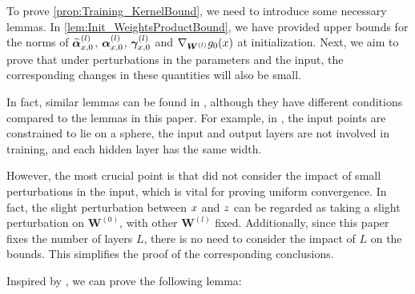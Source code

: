 To prove \cref{prop:Training_KernelBound}, we need to introduce some necessary lemmas.
In \cref{lem:Init_WeightsProductBound}, we have provided upper bounds for the norms of ${\widetilde{\bm{\alpha}}_{x,0}^{(l)}}$, ${{\bm{\alpha}}_{x,0}^{(l)}}$, $\bm{\gamma}^{(l)}_{x,0}$ and $\nabla_{\bm{W}^{(l)}} g_0(x)$ at initialization.
Next, we aim to prove that under perturbations in the parameters and the input, the corresponding changes in these quantities will also be small.

In fact, similar lemmas can be found in \citet{allen-zhu2019_ConvergenceTheory}, although they have different conditions compared to the lemmas in this paper.
For example, in \citet{allen-zhu2019_ConvergenceTheory}, the input points are constrained to lie on a sphere, the input and output layers are not involved in training, and each hidden layer has the same width.

However, the most crucial point is that \citet{allen-zhu2019_ConvergenceTheory} did not consider the impact of small perturbations in the input, which is vital for proving uniform convergence.
In fact, the slight perturbation between $x$ and $z$ can be regarded as taking a slight perturbation on $\bm{W}^{(0)}$, with other $\bm{W}^{(l)} $ fixed.
Additionally, since this paper fixes the number of layers $L$, there is no need to consider the impact of $L$ on the bounds.
This simplifies the proof of the corresponding conclusions.

Inspired by \citet[Lemma 8.2]{allen-zhu2019_ConvergenceTheory}, we can prove the following lemma:

